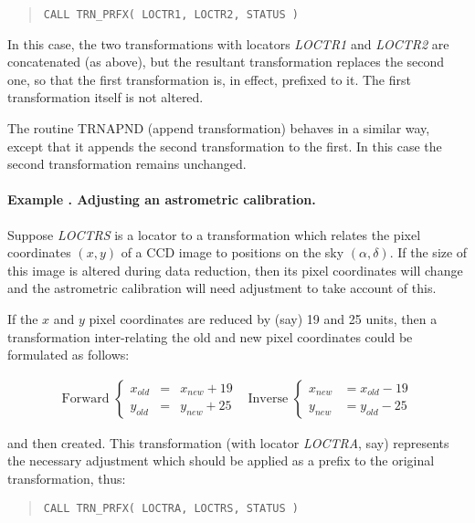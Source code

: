 \documentclass[twoside,11pt]{article}
\renewcommand{\_}{\texttt{\symbol{95}}}
\newcommand{\name}[1]{\mbox{\small{#1}}}
\newcommand{\fortvar}[1]{\mbox{\emph{#1}}}
\newcounter{examplecounter}
\newcommand{\example}[1]{\addtocounter{examplecounter}{1}
                         \paragraph{\textbf{Example \theexamplecounter. #1}}}
\begin{document}
\begin{quote}
\begin{verbatim}
CALL TRN_PRFX( LOCTR1, LOCTR2, STATUS )
\end{verbatim}
\end{quote}

In this case, the two transformations with locators \fortvar{LOCTR1} and
\fortvar{LOCTR2} are concatenated (as above), but the resultant
transformation replaces the second one, so that the first transformation is,
in effect, prefixed to it.
The first transformation itself is not altered.

The routine \name{TRN\_APND} (append transformation) behaves in a similar
way, except that it appends the second transformation to the first. In this
case the second transformation remains unchanged.

\example{Adjusting an astrometric calibration.}
Suppose \fortvar{LOCTRS} is a locator to a transformation which relates the
pixel coordinates \mbox{$(x,y)$} of a \name{CCD} image to positions on the
sky \mbox{$(\alpha,\delta)$}.
If the size of this image is altered during data reduction, then its pixel
coordinates will change and the astrometric calibration will need adjustment
to take account of this.

If the $x$ and $y$ pixel coordinates are reduced by (say) 19 and 25 units,
then a transformation inter-relating the old and new pixel coordinates could
be formulated as follows:

\begin{equation}
\begin{array}{cc}

\mbox{Forward } \left\{
\begin{array}{lll}
x_{old} & = & x_{new} + 19 \\
y_{old} & = & y_{new} + 25
\end{array}
\right.
&
\mbox{Inverse } \left\{
\begin{array}{lll}
x_{new} & = x_{old} - 19 \\
y_{new} & = y_{old} - 25
\end{array}
\right.

\end{array}
\end{equation}

and then created.
This transformation (with locator \fortvar{LOCTRA}, say) represents the
necessary adjustment which should be applied as a prefix to the original
transformation, thus:

\begin{quote}
\begin{verbatim}
CALL TRN_PRFX( LOCTRA, LOCTRS, STATUS )
\end{verbatim}
\end{quote}
\end{document}
